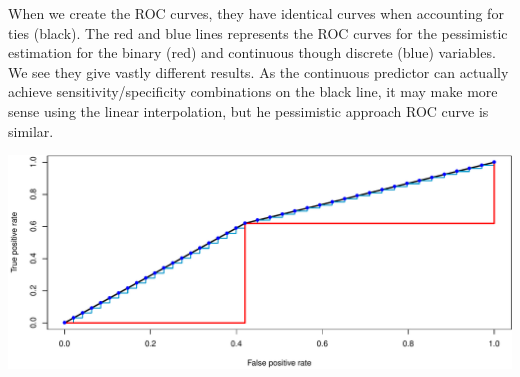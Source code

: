 \documentclass[article]{jss}
\let\origfigure\figure
\let\endorigfigure\endfigure
\renewenvironment{figure}[1][2] {
    \expandafter\origfigure\expandafter[H]
} {
    \endorigfigure
}
\begin{document}
When we create the ROC curves, they have identical curves when
accounting for ties (black). The red and blue lines represents the ROC
curves for the pessimistic estimation for the binary (red) and
continuous though discrete (blue) variables. We see they give vastly
different results. As the continuous predictor can actually achieve
sensitivity/specificity combinations on the black line, it may make more
sense using the linear interpolation, but he pessimistic approach ROC
curve is similar.

\begin{CodeChunk}
\begin{figure}[H]

{\centering \includegraphics{index_revision_files/figure-latex/plotter-1} 

}

\caption[ROC curve of the data in the binary versus extreme categorical variable]{ROC curve of the data in the binary versus extreme categorical variable.}\label{fig:plotter}
\end{figure}
\end{CodeChunk}


\end{document}
